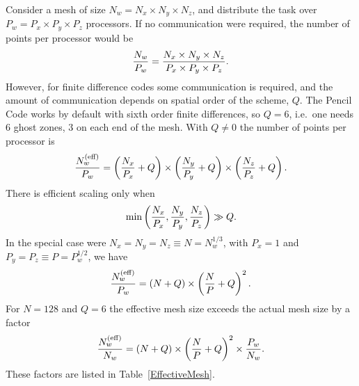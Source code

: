 \documentclass[\mydriver,12pt,twoside,notitlepage,a4paper]{article}
\begin{document}
Consider a mesh of size $N_w=N_x\times N_y\times N_z$,
and distribute the task over $P_w=P_x\times P_y\times P_z$ processors.
If no communication were required, the number of points per processor
would be
\begin{equation}
{N_w\over P_w}={N_x\times N_y\times N_z\over P_x\times P_y\times P_z}.
\end{equation}
However, for finite difference codes some communication is required,
and the amount of communication depends on spatial order of the
scheme, $Q$.
The {\sc Pencil Code} works by default with sixth order finite differences,
so $Q=6$, i.e.\ one needs 6 ghost zones, 3 on each end of the mesh.
With $Q\neq0$ the number of points per processor is
\begin{equation}
{N_w^{\rm(eff)}\over P_w}=
\left({N_x\over P_x}+Q\right)\times
\left({N_y\over P_y}+Q\right)\times
\left({N_z\over P_z}+Q\right).
\end{equation}
There is efficient scaling only when
\begin{equation}
\min\left({N_x\over P_x}, {N_y\over P_y}, {N_z\over P_z}\right)\gg Q.
\end{equation}
In the special case were $N_x=N_y=N_z\equiv N=N_w^{1/3}$,
with $P_x=1$ and $P_y=P_z\equiv P=P_w^{1/2}$, we have
\begin{equation}
{N_w^{\rm(eff)}\over P_w}=
\left(N+Q\right)\times
\left({N\over P}+Q\right)^2.
\end{equation}
For $N=128$ and $Q=6$ the effective mesh size exceeds the actual mesh
size by a factor
\begin{equation}
{N_w^{\rm(eff)}\over N_w}
=\left(N+Q\right)\times\left({N\over P}+Q\right)^2\times{P_w\over N_w}.
\end{equation}
These factors are listed in Table~\ref{EffectiveMesh}.
\end{document}
